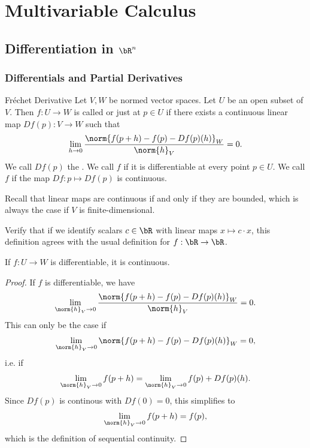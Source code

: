 \part{Multivariable Calculus}
\chapter{Differentiation in $\bR^n$}
\section{Differentials and Partial Derivatives}
\begin{importantdefinition}{Fréchet Derivative}{}
	Let $V,W$ be normed vector spaces. Let $U$ be an open subset of $V$. Then $f : U \to W$ is called  or just  at $p \in U$ if there exists a continuous linear map $Df(p) : V \to W$ such that
	\begin{align*}
		\lim_{h \to 0} \frac{\norm{f(p+h) - f(p) - Df(p)(h)}_W}{\norm{h}_V} = 0.
	\end{align*}
	We call $Df(p)$ the . We call $f$  if it is differentiable at every point $p \in U$. We call $f$  if the map $Df : p \mapsto Df(p)$ is continuous.
\end{importantdefinition}
Recall that linear maps are continuous if and only if they are bounded, which is always the case if $V$ is finite-dimensional.
\begin{exercise}
	Verify that if we identify scalars $c \in \bR$ with linear maps $x \mapsto c \cdot x$, this definition agrees with the usual definition for $f : \bR \to \bR$.
\end{exercise}
\begin{theorem}
	If $f : U \to W$ is differentiable, it is continuous.
\end{theorem}
\begin{proof}
	If $f$ is differentiable, we have
	\begin{align*}
		\lim_{\norm{h}_V \to 0} \frac{\norm{f(p+h) - f(p) - Df(p)(h)}_W}{\norm{h}_V} = 0.
	\end{align*}
	This can only be the case if
	\begin{align*}
		\lim_{\norm{h}_V \to 0} \norm{f(p+h) - f(p) - Df(p)(h)}_W = 0,
	\end{align*}
	i.e. if
	\begin{align*}
		\lim_{\norm{h}_V \to 0} f(p+h) = \lim_{\norm{h}_V \to 0} f(p) + Df(p)(h).
	\end{align*}
	Since $Df(p)$ is continous with $Df(0) = 0$, this simplifies to
	\begin{align*}
		\lim_{\norm{h}_V \to 0} f(p+h) = f(p),
	\end{align*}
	which is the definition of sequential continuity.
\end{proof}
